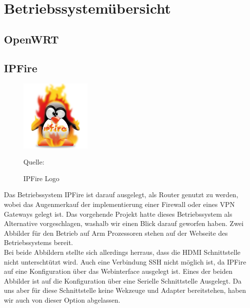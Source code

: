 \chapter{Betriebssystemübersicht}

\section{OpenWRT}

\section{IPFire}
\begin{figure}
\centering
\includegraphics[width=3.5cm]{pictures/Jakob/IPFire}
\caption{IPFire Logo}
Quelle: \cite{fire1}
\end{figure}
Das Betriebssystem IPFire ist darauf ausgelegt, als Router genutzt zu werden, wobei das Augenmerkauf der implementierung einer Firewall oder eines VPN Gateways gelegt ist.
Das vorgehende Projekt hatte dieses Betriebssystem als Alternative vorgeschlagen, washalb wir einen Blick darauf geworfen haben. Zwei Abbilder für den Betrieb auf Arm Prozessoren stehen auf der Webseite des Betriebssystems bereit. \cite{fire} \\
Bei beide Abbildern stellte sich allerdings herraus, dass die HDMI Schnittstelle nicht unterschtützt wird.
Auch eine Verbindung SSH nicht möglich ist, da IPFire auf eine Konfiguration über das Webinterface ausgelegt ist.
Eines der beiden Abbilder ist auf die Konfiguration über eine Serielle Schnittstelle Ausgelegt. Da uns aber für diese Schnittstelle keine Wekzeuge und Adapter bereitstehen, haben wir auch von dieser Option abgelassen.\\

\newpage
